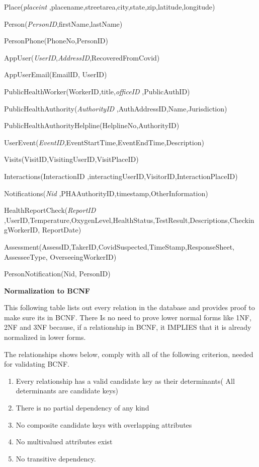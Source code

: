 \documentclass[
]{article}
\begin{document}
Place(\emph{placeint}
,placename,streetarea,city,state,zip,latitude,longitude)

Person(\emph{PersonID},firstName,lastName)

PersonPhone(PhoneNo,PersonID)

AppUser(\emph{UserID},\emph{AddressID},RecoveredFromCovid)

AppUserEmail(EmailID, UserID)

PublicHealthWorker(WorkerID\emph{,}title,\emph{officeID} ,PublicAuthID)

PublicHealthAuthority(\emph{AuthorityID}
,AuthAddressID,Name,Jurisdiction)

PublicHealthAuthorityHelpline(HelplineNo,AuthorityID)

UserEvent(\emph{EventID},EventStartTime,EventEndTime,Description)

Visits(VisitID,VisitingUserID,VisitPlaceID)

Interactions(InteractionID
,interactingUserID,VisitorID,InteractionPlaceID)

Notifications(\emph{Nid} ,PHAAuthorityID,timestamp,OtherInformation)

HealthReportCheck(\emph{ReportID}
,UserID,Temperature,OxygenLevel,HealthStatus,TestResult,Descriptions,CheckingWorkerID,
ReportDate)

Assessment(AssessID,TakerID,CovidSuspected,TimeStamp,ResponseSheet,
AssesseeType, OverseeingWorkerID)

PersonNotification(Nid, PersonID)

\textbf{Normalization to BCNF}

This following table lists out every relation in the database and
provides proof to make sure its in BCNF. There Is no need to prove lower
normal forms like 1NF, 2NF and 3NF because, if a relationship in BCNF,
it IMPLIES that it is already normalized in lower forms.

The relationships shows below, comply with all of the following
criterion, needed for validating BCNF.

\begin{enumerate}
\def\labelenumi{\arabic{enumi}.}
\item
  Every relationship has a valid candidate key as their determinants(
  All determinants are candidate keys)
\item
  There is no partial dependency of any kind
\item
  No composite candidate keys with overlapping attributes
\item
  No multivalued attributes exist
\item
  No transitive dependency.
\end{enumerate}
\end{document}
